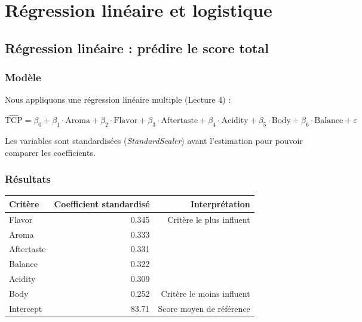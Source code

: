 \documentclass[12pt,a4paper]{article}
\begin{document}
\section{Régression linéaire et logistique}

\subsection{Régression linéaire : prédire le score total}

\subsubsection{Modèle}

Nous appliquons une régression linéaire multiple (Lecture 4) :

\begin{equation}
  \widehat{\text{TCP}} = \beta_0 + \beta_1 \cdot \text{Aroma} + \beta_2 \cdot \text{Flavor}
  + \beta_3 \cdot \text{Aftertaste} + \beta_4 \cdot \text{Acidity}
  + \beta_5 \cdot \text{Body} + \beta_6 \cdot \text{Balance} + \varepsilon
\end{equation}

Les variables sont standardisées (\textit{StandardScaler}) avant l'estimation pour pouvoir
comparer les coefficients.

\subsubsection{Résultats}

\begin{center}
\begin{tabular}{@{}lrr@{}}
\toprule
\rowcolor{coffeecream}
\textbf{Critère} & \textbf{Coefficient standardisé} & \textbf{Interprétation} \\
\midrule
Flavor      & 0.345 & Critère le plus influent \\
Aroma       & 0.333 & \\
Aftertaste  & 0.331 & \\
Balance     & 0.322 & \\
Acidity     & 0.309 & \\
Body        & 0.252 & Critère le moins influent \\
\midrule
Intercept   & 83.71 & Score moyen de référence \\
\bottomrule
\end{tabular}
\end{center}
\end{document}
